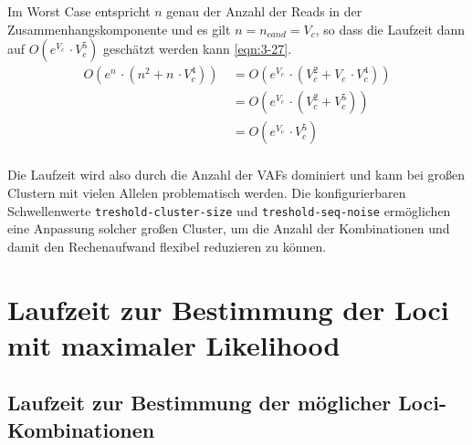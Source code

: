 Im Worst Case entspricht $ n $ genau der Anzahl der Reads in der Zusammenhangskomponente und es gilt $ n = n_{cand} = V_{c} $, so dass die Laufzeit dann auf $ O(e^{V_{c}} \, \cdotp V_{c}^5) $ geschätzt werden kann \eqref{eqn:3-27}.
\begin{equation} \label{eqn:3-27}
\tag{3-27}
\begin{aligned}
O(e^n \, \cdotp (n^2 + n \, \cdotp V_{c}^4))
&\ {} = O(e^{V_{c}} \, \cdotp (V_{c}^2 + V_{c} \, \cdotp V_{c}^4))\\
&\ = O(e^{V_{c}} \, \cdotp (V_{c}^2 + V_{c}^5))\\
&\ = O(e^{V_{c}} \, \cdotp V_{c}^5) \\
\end{aligned}
\end{equation}

Die Laufzeit wird also durch die Anzahl der VAFs dominiert und kann bei großen Clustern mit vielen Allelen problematisch werden. Die konfigurierbaren Schwellenwerte \lstinline|treshold-cluster-size| und \lstinline|treshold-seq-noise| ermöglichen eine Anpassung solcher großen Cluster, um die Anzahl der Kombinationen und damit den Rechenaufwand flexibel reduzieren zu können.


\section{Laufzeit zur Bestimmung der Loci mit maximaler Likelihood}

\subsection{Laufzeit zur Bestimmung der möglicher Loci-Kombinationen}

